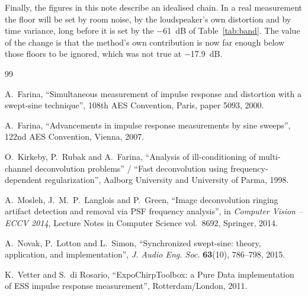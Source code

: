 \documentclass[11pt,a4paper]{article}
\begin{document}
Finally, the figures in this note describe an idealised chain. In a real
measurement the floor will be set by room noise, by the loudspeaker's own
distortion and by time variance, long before it is set by the
\SI{-61}{\dB} of Table~\ref{tab:band}. The value of the change is that the
method's own contribution is now far enough below those floors to be ignored,
which was not true at \SI{-17.9}{\dB}.

\begin{thebibliography}{99}

A.~Farina,
``Simultaneous measurement of impulse response and distortion with a swept-sine
technique'',
108th AES Convention, Paris, paper 5093, 2000.

A.~Farina,
``Advancements in impulse response measurements by sine sweeps'',
122nd AES Convention, Vienna, 2007.

O.~Kirkeby, P.~Rubak and A.~Farina,
``Analysis of ill-conditioning of multi-channel deconvolution problems'' /
``Fast deconvolution using frequency-dependent regularization'',
Aalborg University and University of Parma, 1998.

A.~Mosleh, J.~M.~P.~Langlois and P.~Green,
``Image deconvolution ringing artifact detection and removal via PSF frequency
analysis'',
in \emph{Computer Vision -- ECCV 2014}, Lecture Notes in Computer Science
vol.~8692, Springer, 2014.

A.~Novak, P.~Lotton and L.~Simon,
``Synchronized swept-sine: theory, application, and implementation'',
\emph{J. Audio Eng. Soc.} \textbf{63}(10), 786--798, 2015.

K.~Vetter and S.~di Rosario,
``ExpoChirpToolbox: a Pure Data implementation of ESS impulse response
measurement'',
Rotterdam/London, 2011.

\end{thebibliography}
\end{document}
